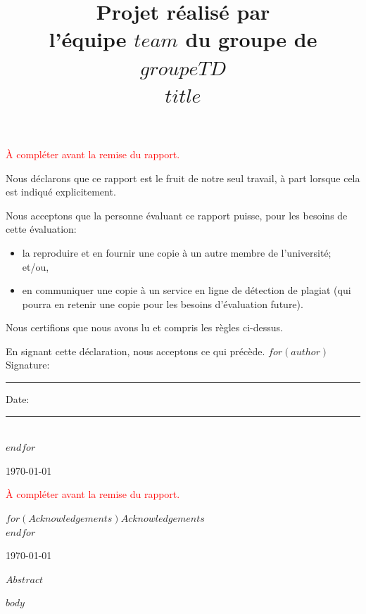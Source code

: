 \documentclass[mstat,12pt]{unswthesis}
\title{Projet réalisé par\\[0.5cm] l'équipe $team$ du groupe de $groupeTD$ \\[3cm]$title$}
\author{\Authornameonly}
\begin{document}
\beforepreface




\textcolor{red}{À compléter avant la remise du rapport.}

\vskip 2pc \noindent Nous déclarons que ce rapport est le fruit de notre seul travail, à part lorsque cela est indiqué  explicitement. 

\vskip 2pc  \noindent Nous acceptons que la personne évaluant ce rapport puisse, pour les besoins de cette évaluation:
\begin{itemize}
\item la reproduire et en fournir une copie à un autre membre de l'université; et/ou,
\item en communiquer une copie à un service en ligne de détection de plagiat (qui pourra en retenir une copie pour les besoins d'évaluation future).
\end{itemize}

\vskip 2pc \noindent Nous certifions que nous avons lu et compris les règles ci-dessus.\vspace{24pt}

\vskip 2pc \noindent En signant cette déclaration, nous acceptons ce qui précède.
\vskip 2pc \noindent
$for(author)$
Signature: \rule{7cm}{0.25pt} \hfill Date: \rule{4cm}{0.25pt} \\[1cm]
$endfor$
\vskip 1pc


{\bigskip\bigskip\bigskip\noindent} \today




\textcolor{red}{À compléter avant la remise du rapport.}

{\bigskip}$for(Acknowledgements)$$Acknowledgements$\\[1cm] $endfor$

{\bigskip\bigskip\bigskip\noindent} \today




$Abstract$



\afterpreface





%
%






$body$
\end{document}
